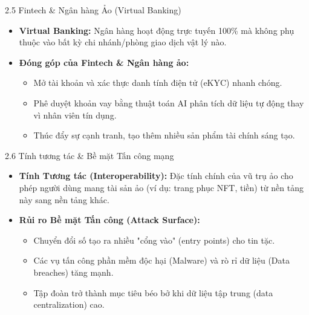 \documentclass[aspectratio=169]{beamer}
\begin{document}
\begin{frame}{2.5 Fintech \& Ngân hàng Ảo (Virtual Banking)}
    \begin{itemize}
        \item \textbf{Virtual Banking:} Ngân hàng hoạt động trực tuyến 100\% mà không phụ thuộc vào bất kỳ chi nhánh/phòng giao dịch vật lý nào.
        \item \textbf{Đóng góp của Fintech \& Ngân hàng ảo:}
        \begin{itemize}
            \item Mở tài khoản và xác thực danh tính điện tử (eKYC) nhanh chóng.
            \item Phê duyệt khoản vay bằng thuật toán AI phân tích dữ liệu tự động thay vì nhân viên tín dụng.
            \item Thúc đẩy sự cạnh tranh, tạo thêm nhiều sản phẩm tài chính sáng tạo.
        \end{itemize}
    \end{itemize}
\end{frame}

\begin{frame}{2.6 Tính tương tác \& Bề mặt Tấn công mạng}
    \begin{itemize}
        \item \textbf{Tính Tương tác (Interoperability):} Đặc tính chính của vũ trụ ảo cho phép người dùng mang tài sản ảo (ví dụ: trang phục NFT, tiền) từ nền tảng này sang nền tảng khác.
        \item \textbf{Rủi ro Bề mặt Tấn công (Attack Surface):}
        \begin{itemize}
            \item Chuyển đổi số tạo ra nhiều "cổng vào" (entry points) cho tin tặc.
            \item Các vụ tấn công phần mềm độc hại (Malware) và rò rỉ dữ liệu (Data breaches) tăng mạnh.
            \item Tập đoàn trở thành mục tiêu béo bở khi dữ liệu tập trung (data centralization) cao.
        \end{itemize}
    \end{itemize}
\end{frame}
\end{document}
